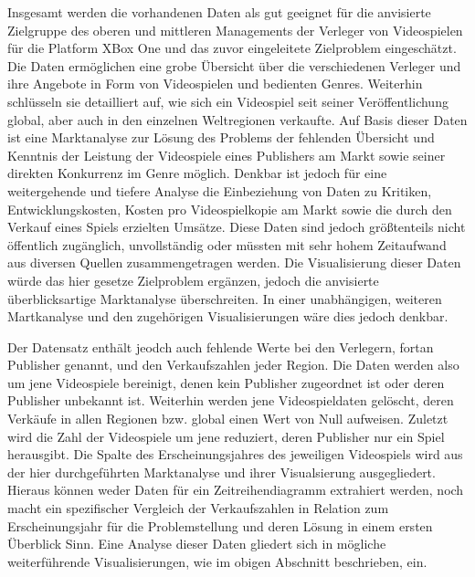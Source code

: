 \documentclass[usegeometry=true]{scrartcl}
\begin{document}
Insgesamt werden die vorhandenen Daten als gut geeignet für die anvisierte Zielgruppe des oberen und mittleren Managements der Verleger von Videospielen für die Platform XBox One und das zuvor eingeleitete Zielproblem eingeschätzt. 
Die Daten ermöglichen eine grobe Übersicht über die verschiedenen Verleger und ihre Angebote in Form von Videospielen und bedienten Genres. 
Weiterhin schlüsseln sie detailliert auf, wie sich ein Videospiel seit seiner Veröffentlichung global, aber auch in den einzelnen Weltregionen verkaufte. Auf Basis dieser Daten ist eine Marktanalyse zur Lösung des Problems der fehlenden Übersicht und Kenntnis der Leistung der Videospiele eines Publishers am Markt sowie seiner direkten Konkurrenz im Genre möglich. 
Denkbar ist jedoch für eine weitergehende und tiefere Analyse die Einbeziehung von Daten zu Kritiken, Entwicklungskosten, Kosten pro Videospielkopie am Markt sowie die durch den Verkauf eines Spiels erzielten Umsätze. 
Diese Daten sind jedoch größtenteils nicht öffentlich zugänglich, unvollständig oder müssten mit sehr hohem Zeitaufwand aus diversen Quellen zusammengetragen werden. 
Die Visualisierung dieser Daten würde das hier gesetze Zielproblem ergänzen, jedoch die anvisierte überblicksartige Marktanalyse überschreiten. In einer unabhängigen, weiteren Martkanalyse und den zugehörigen Visualisierungen wäre dies jedoch denkbar.    

Der Datensatz enthält jeodch auch fehlende Werte bei den Verlegern, fortan Publisher genannt, und den Verkaufszahlen jeder Region. Die Daten werden also um jene Videospiele bereinigt, denen kein Publisher zugeordnet ist oder deren Publisher unbekannt ist. 
Weiterhin werden jene Videospieldaten gelöscht, deren Verkäufe in allen Regionen bzw. global einen Wert von Null aufweisen. 
Zuletzt wird die Zahl der Videospiele um jene reduziert, deren Publisher nur ein Spiel herausgibt.  
Die Spalte des Erscheinungsjahres des jeweiligen Videospiels wird aus der hier durchgeführten Marktanalyse und ihrer Visualsierung ausgegliedert. 
Hieraus können weder Daten für ein Zeitreihendiagramm extrahiert werden, noch macht ein spezifischer Vergleich der Verkaufszahlen in Relation zum Erscheinungsjahr für die Problemstellung und deren Lösung in einem ersten Überblick Sinn. Eine Analyse dieser Daten gliedert sich in mögliche weiterführende Visualisierungen, wie im obigen Abschnitt beschrieben, ein. 
\end{document}
